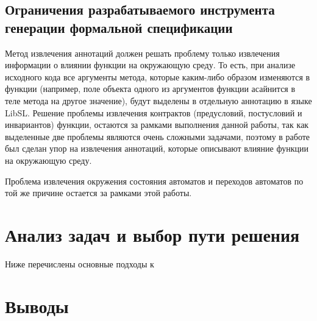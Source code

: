 \subsection{Ограничения разрабатываемого инструмента генерации формальной спецификации}

Метод извлечения аннотаций должен решать проблему только извлечения информации о влиянии функции на окружающую среду.
То есть, при анализе исходного кода все аргументы метода, которые каким-либо образом изменяются в функции (например, поле объекта одного из аргументов функции асайнится в теле метода на другое значение), будут выделены в отдельную аннотацию в языке LibSL.
Решение проблемы извлечения контрактов (предусловий, постусловий и инвариантов) функции,
остаются за рамками выполнения данной работы, так как выделенные две проблемы являются очень сложными задачами,
поэтому в работе был сделан упор на извлечения аннотаций, которые описывают влияние функции на окружающую среду.

Проблема извлечения окружения состояния автоматов и переходов автоматов по той же причине остается за рамками этой работы.

\section{Анализ задач и выбор пути решения}

Ниже перечислены основные подходы к

\section{Выводы}
